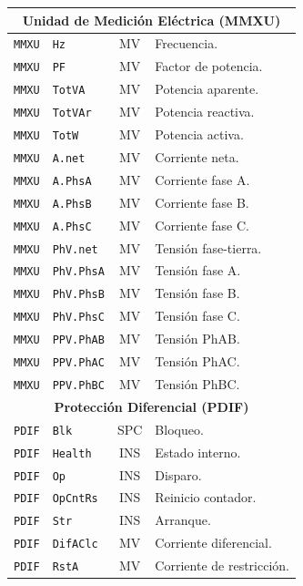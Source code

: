 \begin{longtable}{l l c p{7cm}}
    \multicolumn{4}{c}{\textbf{Unidad de Medición Eléctrica (MMXU)}} \\ \midrule
    \texttt{MMXU} & \texttt{Hz} & MV & Frecuencia. \\
    \texttt{MMXU} & \texttt{PF} & MV & Factor de potencia. \\
    \texttt{MMXU} & \texttt{TotVA} & MV & Potencia aparente. \\
    \texttt{MMXU} & \texttt{TotVAr} & MV & Potencia reactiva. \\
    \texttt{MMXU} & \texttt{TotW} & MV & Potencia activa. \\
    \texttt{MMXU} & \texttt{A.net} & MV & Corriente neta. \\
    \texttt{MMXU} & \texttt{A.PhsA} & MV & Corriente fase A. \\
    \texttt{MMXU} & \texttt{A.PhsB} & MV & Corriente fase B. \\
    \texttt{MMXU} & \texttt{A.PhsC} & MV & Corriente fase C. \\
    \texttt{MMXU} & \texttt{PhV.net} & MV & Tensión fase-tierra. \\
    \texttt{MMXU} & \texttt{PhV.PhsA} & MV & Tensión fase A. \\
    \texttt{MMXU} & \texttt{PhV.PhsB} & MV & Tensión fase B. \\
    \texttt{MMXU} & \texttt{PhV.PhsC} & MV & Tensión fase C. \\
    \texttt{MMXU} & \texttt{PPV.PhAB} & MV & Tensión PhAB. \\
    \texttt{MMXU} & \texttt{PPV.PhAC} & MV & Tensión PhAC. \\
    \texttt{MMXU} & \texttt{PPV.PhBC} & MV & Tensión PhBC. \\
    \midrule
    
    \multicolumn{4}{c}{\textbf{Protección Diferencial (PDIF)}} \\ \midrule
    \texttt{PDIF} & \texttt{Blk} & SPC & Bloqueo. \\
    \texttt{PDIF} & \texttt{Health} & INS & Estado interno. \\
    \texttt{PDIF} & \texttt{Op} & INS & Disparo. \\
    \texttt{PDIF} & \texttt{OpCntRs} & INS & Reinicio contador. \\
    \texttt{PDIF} & \texttt{Str} & INS & Arranque. \\
    \texttt{PDIF} & \texttt{DifAClc} & MV & Corriente diferencial. \\
    \texttt{PDIF} & \texttt{RstA} & MV & Corriente de restricción. \\
    \midrule
    

\end{longtable}
